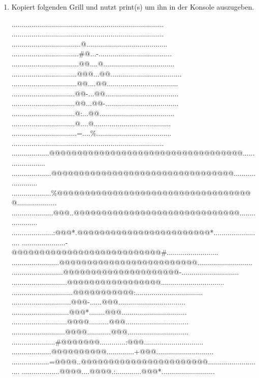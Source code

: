 \documentclass{../../sheet}
\begin{document}
\begin{enumerate}
    \item Kopiert folgenden Grill und nutzt print(s) um ihn in der Konsole auszugeben. 
    \begin{ausgabe}
.............................................................................
.............................................................................
...................................@.........................................
..................................\#@...-.....................................
..................................@@....@....................................
.................................@@@...@@....................................
.................................@@....@@....................................
................................@@-...@@.....................................
................................@@...@@-.....................................
................................@:...@@......................................
................................@....@.......................................
.................................=....\%......................................
.............................................................................
...................@@@@@@@@@@@@@@@@@@@@@@@@@@@@@@@@@@@.......................
....................@@@@@@@@@@@@@@@@@@@@@@@@@@@@@@@@@........................
....................\%@@@@@@@@@@@@@@@@@@@@@@@@@@@@@@@@@@@@....................
.....................@@@..@@@@@@@@@@@@@@@@@@@@@@@@@@@@@@.....................
.....................:@@@*.@@@@@@@@@@@@@@@@@@@@@@@@*.........................
......................-@@@@@@@@@@@@@@@@@@@@@@@@@@@\#..........................
........................@@@@@@@@@@@@@@@@@@@@@@@@@............................
..........................@@@@@@@@@@@@@@@@@@@@@-.............................
............................@@@@@@@@@@@@@@@@@................................
...............................@@@@@@@@@@@:..................................
..............................@@@-......@@@..................................
.............................@@@*........@@@.................................
............................@@@@..........@@@................................
...........................@@@@............@@@...............................
......................\#@@@@@@@.............:@@@..............................
....................@@@@@@@@@@..............+@@@.............................
...................=@@@@..@@@@@@@@@@@@@@@@@@@@@@@............................
...................@@@@....@@@@.:.............@@@*...........................

\end{ausgabe}
\end{enumerate}
\end{document}
